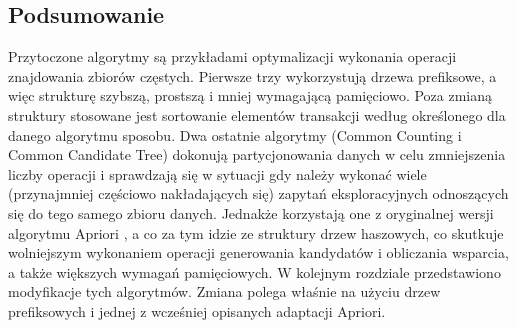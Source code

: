 \subsection{Podsumowanie}
\label{c327}
Przytoczone algorytmy są przykładami optymalizacji wykonania operacji znajdowania zbiorów częstych. Pierwsze trzy wykorzystują drzewa prefiksowe, a więc strukturę szybszą, prostszą i mniej wymagającą pamięciowo. Poza zmianą struktury stosowane jest sortowanie elementów transakcji według określonego dla danego algorytmu sposobu. Dwa ostatnie algorytmy (Common Counting i Common Candidate Tree) dokonują partycjonowania danych w celu zmniejszenia liczby operacji i sprawdzają się w sytuacji gdy należy wykonać wiele (przynajmniej częściowo nakładających się) zapytań eksploracyjnych odnoszących się do tego samego zbioru danych. Jednakże korzystają one z oryginalnej wersji algorytmu Apriori \cite{Agrawal}, a co za tym idzie ze struktury drzew haszowych, co skutkuje wolniejszym wykonaniem operacji generowania kandydatów i obliczania wsparcia, a także większych wymagań pamięciowych. W kolejnym rozdziale przedstawiono modyfikacje tych algorytmów. Zmiana polega właśnie na użyciu drzew prefiksowych i jednej z wcześniej opisanych adaptacji Apriori.